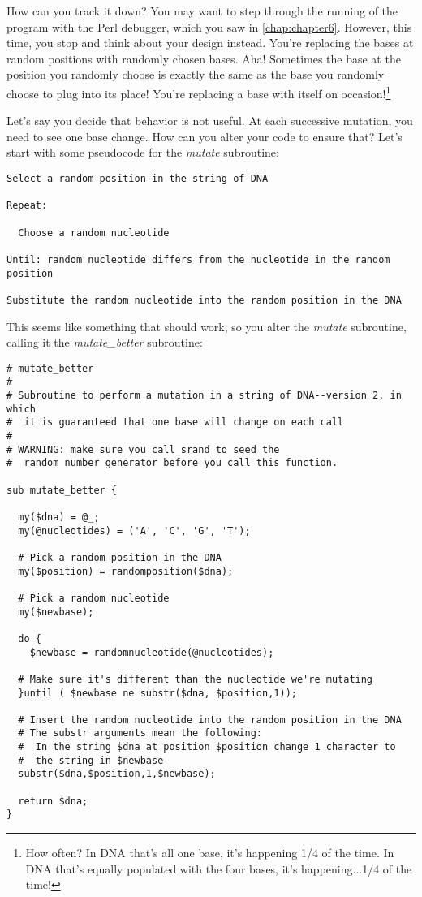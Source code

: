 How can you track it down? You may want to step through the running of the program with the Perl debugger, which you saw in \autoref{chap:chapter6}. However, this time, you stop and think about your design instead. You're replacing the bases at random positions with randomly chosen bases. Aha!  Sometimes the base at the position you randomly choose is exactly the same as the base you randomly choose to plug into its place! You're replacing a base with itself on occasion!\footnote{How often? In DNA that's all one base, it's happening 1/4 of the time. In DNA that's equally populated with the four bases, it's happening...1/4 of the time!} 

Let's say you decide that behavior is not useful. At each successive mutation, you need to see one base change. How can you alter your code to ensure that? Let's start with some pseudocode for the \textit{mutate} subroutine: 

\begin{lstlisting}
Select a random position in the string of DNA

Repeat:

  Choose a random nucleotide

Until: random nucleotide differs from the nucleotide in the random position

Substitute the random nucleotide into the random position in the DNA
\end{lstlisting}

This seems like something that should work, so you alter the \textit{mutate} subroutine, calling it the \textit{mutate\_better} subroutine: 

\begin{lstlisting}
# mutate_better
#
# Subroutine to perform a mutation in a string of DNA--version 2, in which
#  it is guaranteed that one base will change on each call
#
# WARNING: make sure you call srand to seed the
#  random number generator before you call this function.

sub mutate_better {

  my($dna) = @_;
  my(@nucleotides) = ('A', 'C', 'G', 'T');

  # Pick a random position in the DNA
  my($position) = randomposition($dna);

  # Pick a random nucleotide
  my($newbase);

  do {
    $newbase = randomnucleotide(@nucleotides);

  # Make sure it's different than the nucleotide we're mutating
  }until ( $newbase ne substr($dna, $position,1));

  # Insert the random nucleotide into the random position in the DNA
  # The substr arguments mean the following:
  #  In the string $dna at position $position change 1 character to
  #  the string in $newbase
  substr($dna,$position,1,$newbase);

  return $dna;
}
\end{lstlisting}

